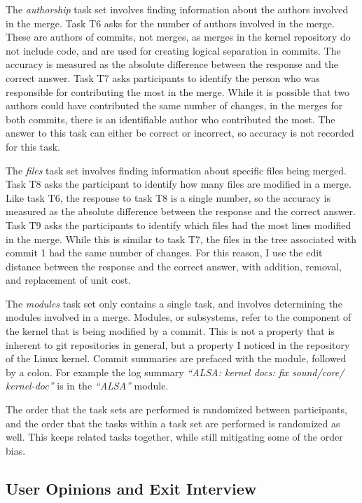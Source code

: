 The \emph{authorship} task set involves finding information about the
authors involved in the merge. Task T6 asks for the number of authors
involved in the merge. These are authors of commits, not merges, as
merges in the kernel repository do not include code, and are used for
creating logical separation in commits. The accuracy is measured as the
absolute difference between the response and the correct answer. Task T7
asks participants to identify the person who was responsible for
contributing the most in the merge. While it is possible that two
authors could have contributed the same number of changes, in the merges
for both commits, there is an identifiable author who contributed the
most. The answer to this task can either be correct or incorrect, so
accuracy is not recorded for this task.

The \emph{files} task set involves finding information about specific
files being merged. Task T8 asks the participant to identify how many
files are modified in a merge. Like task T6, the response to task T8 is
a single number, so the accuracy is measured as the absolute difference
between the response and the correct answer. Task T9 asks the
participants to identify which files had the most lines modified in
the merge. While this is similar to task T7, the files in the tree
associated with commit 1 had the same number of changes. For this
reason, I use the edit distance between the response and the correct
answer, with addition, removal, and replacement of unit cost.

The \emph{modules} task set only contains a single task, and involves
determining the modules involved in a merge. Modules, or subsystems,
refer to the component of the kernel that is being modified by a commit.
This is not a property that is inherent to git repositories in general,
but a property I noticed in the repository of the Linux kernel. Commit
summaries are prefaced with the module, followed by a colon. For example
the log summary \textit{``ALSA: kernel docs: fix sound/core/
  kernel-doc''} is in the \textit{``ALSA''} module.

The order that the task sets are performed is randomized between
participants, and the order that the tasks within a task set are
performed is randomized as well. This keeps related tasks together,
while still mitigating some of the order bias.

\subsection{User Opinions and Exit Interview}
\label{sub:user_opinions_and_exit_interview}


